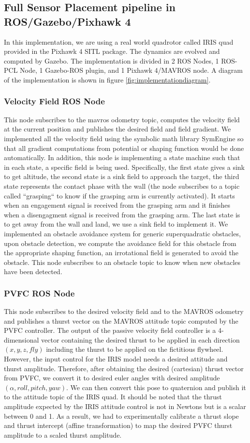 \subsection{Full Sensor Placement pipeline in ROS/Gazebo/Pixhawk 4}
In this implementation, we are using a real world quadrotor called IRIS quad provided in the Pixhawk 4 SITL package. 
The dynamics are evolved and computed by Gazebo. 
The implementation is divided in 2 ROS Nodes, 1 ROS-PCL Node, 1 Gazebo-ROS plugin, and 1 Pixhawk 4/MAVROS node.
A diagram of the implementation is shown in figure \ref{fig:implementationdiagram}.
\subsubsection{Velocity Field ROS Node}
This node subscribes to the mavros odometry topic, computes the velocity field at the current position and publishes the desired field and field gradient. 
We implemented all the velocity field using the symbolic math library SymEngine so that all gradient computations from potential or shaping function would be done automatically. 
In addition, this node is implementing a state machine such that in each state, a specific field is being used.
Specifically, the first state gives a sink to get altitude, the second state is a sink field to approach the target, 
the third state represents the contact phase with the wall (the node subscribes to a topic called ``grasping`` to know if the grasping arm is currently activated). It starts when an engagement signal is received from the grasping arm and it finishes when a disengagment signal is received from the grasping arm. 
The last state is to get away from the wall and land, we use a sink field to implement it.
We implemented an obstacle avoidance system for generic superquadratic obstacles, upon obstacle detection, we compute the avoidance field for this obstacle from the appropriate shaping function, an irrotational field is generated to avoid the obstacle. This node subscribes to an obstacle topic to know when new obstacles have been detected. 
\subsubsection{PVFC ROS Node}
This node subscribes to the desired velocity field and to the MAVROS odometry and publishes a thurst vector on the MAVROS attitude topic computed by the PVFC controller. The output of the passive velocity field controller is a 4-dimensional vector containing the desired thrust to be applied in each direction $(x,y,z, fly)$ including the thurst to be applied on the fictitious flywheel. 
However, the input control for the IRIS model needs a desired attitude and thurst amplitude. Therefore, after obtaining the desired (cartesian) thrust vector from PVFC, we convert it to desired euler angles with desired amplitude $(\alpha, roll, pitch, yaw)$. 
We can then convert this pose to quaternion and publish it to the attitude topic of the IRIS quad.
It should be noted that the thrust amplitude expected by the IRIS attitude control is not in Newtons but is a scalar between 0 and 1. As a result, we had to experimentally calibrate a thrust slope and thrust intercept (affine transformation) to map the desired PVFC thurst amplitude to a scaled thurst amplitude. 
